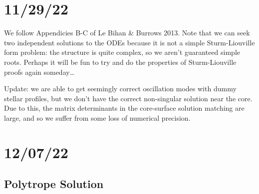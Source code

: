 \documentclass[11pt,
        usenames, %
        twocolumn,
        landscape,
        dvipsnames %
    ]{article}
\begin{document}
\section{11/29/22}

We follow Appendicies B-C of Le Bihan \& Burrows 2013. Note that we can seek two
independent solutions to the ODEs because it is not a simple Sturm-Liouville
form problem: the structure is quite complex, so we aren't guaranteed simple
roots. Perhaps it will be fun to try and do the properties of Sturm-Liouville
proofs again someday\dots

Update: we are able to get seemingly correct oscillation modes with dummy
stellar profiles, but we don't have the correct non-singular solution near the
core. Due to this, the matrix determinants in the core-surface solution matching
are large, and so we suffer from some loss of numerical precision.

\section{12/07/22}

\subsection{Polytrope Solution}
\end{document}
